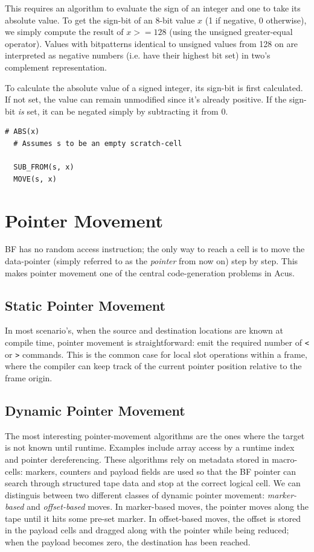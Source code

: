 This requires an algorithm to evaluate the sign of an integer and one to take its absolute value. To get the sign-bit of an 8-bit value $x$ (1 if negative, 0 otherwise), we simply compute the result of $x >= 128$ (using the unsigned greater-equal operator). Values with bitpatterns identical to unsigned values from 128 on are interpreted as negative numbers (i.e. have their highest bit set) in two's complement representation.

To calculate the absolute value of a signed integer, its sign-bit is first calculated. If not set, the value can remain unmodified since it's already positive. If the sign-bit \emph{is} set, it can be negated simply by subtracting it from 0.

\vspace{0.5cm}\noindent\begin{minipage}{\linewidth}
\begin{lstlisting}[style=brainfuck]
  # ABS(x)
  # Assumes s to be an empty scratch-cell

  SUB_FROM(s, x)
  MOVE(s, x)
\end{lstlisting}
\end{minipage}

\section{Pointer Movement}
BF has no random access instruction; the only way to reach a cell is to move the data-pointer (simply referred to as the \emph{pointer} from now on) step by step. This makes pointer movement one of the central code-generation problems in Acus. 

\subsection{Static Pointer Movement}
In most scenario's, when the source and destination locations are known at compile time, pointer movement is straightforward: emit the required number of \texttt{<} or \texttt{>} commands. This is the common case for local slot operations within a frame, where the compiler can keep track of the current pointer position relative to the frame origin.

\subsection{Dynamic Pointer Movement}
The most interesting pointer-movement algorithms are the ones where the target is not known until runtime. Examples include array access by a runtime index and pointer dereferencing. These algorithms rely on metadata stored in macro-cells: markers, counters and payload fields are used so that the BF pointer can search through structured tape data and stop at the correct logical cell. We can distinguis between two different classes of dynamic pointer movement: \emph{marker-based} and \emph{offset-based} moves. In marker-based moves, the pointer moves along the tape until it hits some pre-set marker. In offset-based moves, the offset is stored in the payload cells and dragged along with the pointer while being reduced; when the payload becomes zero, the destination has been reached. 

